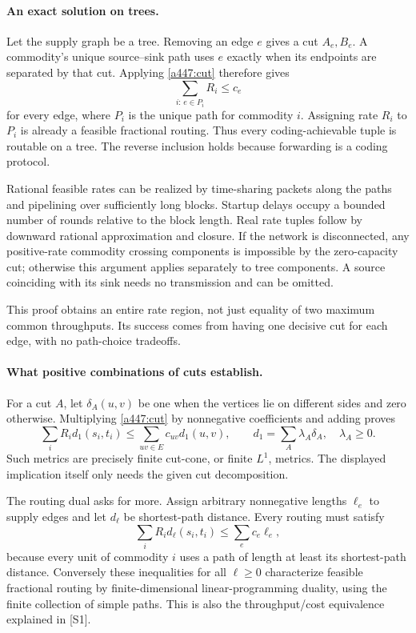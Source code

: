 \documentclass[11pt]{article}
\begin{document}
\paragraph{An exact solution on trees.}
Let the supply graph be a tree. Removing an edge $e$ gives a cut $A_e,B_e$. A commodity's unique source--sink path uses $e$ exactly when its endpoints are separated by that cut. Applying \eqref{a447:cut} therefore gives
\[
 \sum_{i:\,e\in P_i}R_i\le c_e
\]
for every edge, where $P_i$ is the unique path for commodity $i$. Assigning rate $R_i$ to $P_i$ is already a feasible fractional routing. Thus every coding-achievable tuple is routable on a tree. The reverse inclusion holds because forwarding is a coding protocol.

Rational feasible rates can be realized by time-sharing packets along the paths and pipelining over sufficiently long blocks. Startup delays occupy a bounded number of rounds relative to the block length. Real rate tuples follow by downward rational approximation and closure. If the network is disconnected, any positive-rate commodity crossing components is impossible by the zero-capacity cut; otherwise this argument applies separately to tree components. A source coinciding with its sink needs no transmission and can be omitted.

This proof obtains an entire rate region, not just equality of two maximum common throughputs. Its success comes from having one decisive cut for each edge, with no path-choice tradeoffs.

\paragraph{What positive combinations of cuts establish.}
For a cut $A$, let $\delta_A(u,v)$ be one when the vertices lie on different sides and zero otherwise. Multiplying \eqref{a447:cut} by nonnegative coefficients and adding proves
\[
 \sum_iR_i d_1(s_i,t_i)\le
       \sum_{uv\in E}c_{uv}d_1(u,v),
 \qquad d_1=\sum_A\lambda_A\delta_A,\quad\lambda_A\ge0.
 \tag{447.1}
\]
Such metrics are precisely finite cut-cone, or finite $L^1$, metrics. The displayed implication itself only needs the given cut decomposition.

The routing dual asks for more. Assign arbitrary nonnegative lengths $\ell_e$ to supply edges and let $d_\ell$ be shortest-path distance. Every routing must satisfy
\begin{equation}\label{a447:metric}
 \sum_iR_i d_\ell(s_i,t_i)\le\sum_e c_e\ell_e,
\end{equation}
because every unit of commodity $i$ uses a path of length at least its shortest-path distance. Conversely these inequalities for all $\ell\ge0$ characterize feasible fractional routing by finite-dimensional linear-programming duality, using the finite collection of simple paths. This is also the throughput/cost equivalence explained in [S1].
\end{document}
